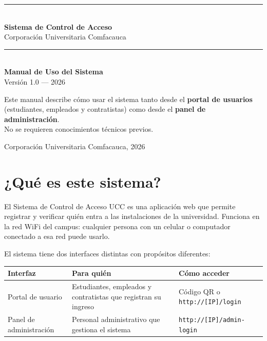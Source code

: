 \documentclass[12pt, a4paper]{article}
\begin{document}

\begin{titlepage}
  \centering
  \vspace*{2.5cm}
  {\color{uccazul}\rule{\textwidth}{2.5pt}}\\[1em]
  {\Huge\bfseries\color{uccazul} Sistema de Control de Acceso}\\[0.6em]
  {\LARGE\color{uccgris} Corporación Universitaria Comfacauca}\\[0.6em]
  {\color{uccazul}\rule{\textwidth}{2.5pt}}\\[2em]

  {\Large\bfseries Manual de Uso del Sistema}\\[0.5em]
  {\large\color{uccgris} Versión 1.0 — 2026}

  \vfill

  \begin{tcolorbox}[colback=uccazul!5, colframe=uccazul!30, width=0.85\textwidth]
    \centering
    \small\color{uccgris}
    Este manual describe cómo usar el sistema tanto desde el
    \textbf{portal de usuarios} (estudiantes, empleados y contratistas)
    como desde el \textbf{panel de administración}.\\[0.4em]
    No se requieren conocimientos técnicos previos.
  \end{tcolorbox}

  \vspace{2cm}
  {\color{uccgris}\small Corporación Universitaria Comfacauca, 2026}
\end{titlepage}

\tableofcontents
\newpage

\section{¿Qué es este sistema?}

El Sistema de Control de Acceso UCC es una aplicación web que permite
registrar y verificar quién entra a las instalaciones de la universidad.
Funciona en la red WiFi del campus: cualquier persona con un celular o
computador conectado a esa red puede usarlo.

El sistema tiene dos interfaces distintas con propósitos diferentes:

\begin{center}
\renewcommand{\arraystretch}{1.5}
\begin{tabular}{@{} p{3.5cm} p{5.5cm} p{4.5cm} @{}}
  \toprule
  \textbf{Interfaz} & \textbf{Para quién} & \textbf{Cómo acceder} \\
  \midrule
  Portal de usuario &
    Estudiantes, empleados y contratistas que registran su ingreso &
    Código QR o \texttt{http://[IP]/login} \\[0.4em]
  Panel de administración &
    Personal administrativo que gestiona el sistema &
    \texttt{http://[IP]/admin-login} \\
  \bottomrule
\end{tabular}
\end{center}
\end{document}
